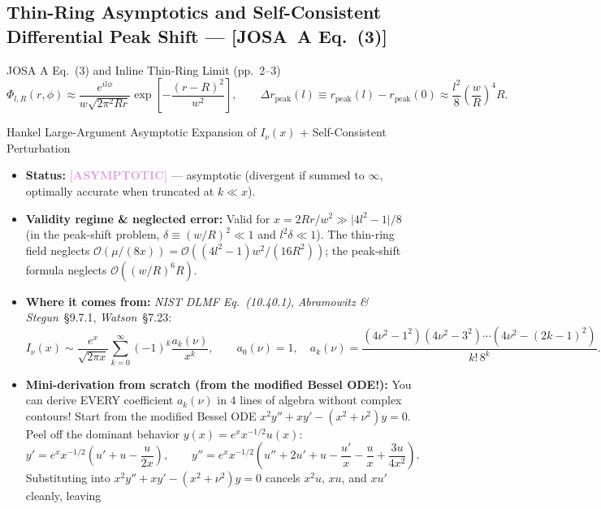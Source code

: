 \documentclass[10pt,letterpaper]{article}
\newcommand{\abs}[1]{\lvert #1 \rvert}
\newcommand{\josa}[1]{\textbf{[JOSA~A Eq.~(#1)]}}
\newcommand{\tagasymp}{\textcolor{plum}{\textbf{[ASYMPTOTIC]}}}
\numberwithin{equation}{section}
\begin{document}
\subsection{Thin-Ring Asymptotics and Self-Consistent Differential Peak Shift --- \josa{3}}

\begin{targeteq}{JOSA A Eq.~(3) and Inline Thin-Ring Limit (pp.~2--3)}
\[
  \Phi_{l,R}(r,\phi) \approx \frac{e^{il\phi}}{w\sqrt{2\pi^2 Rr}}\exp\!\left[-\frac{(r-R)^2}{w^2}\right], \qquad
  \Delta r_{\mathrm{peak}}(l) \equiv r_{\mathrm{peak}}(l) - r_{\mathrm{peak}}(0) \approx \frac{l^2}{8}\left(\frac{w}{R}\right)^4 R.
\]
\end{targeteq}

\begin{approxbox}{Hankel Large-Argument Asymptotic Expansion of $I_\nu(x)$ + Self-Consistent Perturbation}
\begin{itemize}[leftmargin=1.4em,itemsep=2pt,topsep=1pt]
  \item \textbf{Status:} \tagasymp{} --- asymptotic (divergent if summed to $\infty$, optimally accurate when truncated at $k \ll x$).
  \item \textbf{Validity regime \& neglected error:} Valid for $x = 2Rr/w^2 \gg \abs{4l^2 - 1}/8$ (in the peak-shift problem, $\delta \equiv (w/R)^2 \ll 1$ and $l^2\delta \ll 1$). The thin-ring field neglects $\mathcal{O}(\mu/(8x)) = \mathcal{O}((4l^2-1)w^2/(16 R^2))$; the peak-shift formula neglects $\mathcal{O}((w/R)^6 R)$.
  \item \textbf{Where it comes from:} \emph{NIST DLMF Eq.~(10.40.1)}, \emph{Abramowitz \& Stegun}~\S9.7.1, \emph{Watson}~\S7.23:
  \begin{equation}
    I_\nu(x) \sim \frac{e^x}{\sqrt{2\pi x}}\sum_{k=0}^\infty (-1)^k \frac{a_k(\nu)}{x^k}, \qquad a_0(\nu) = 1, \quad a_k(\nu) = \frac{(4\nu^2 - 1^2)(4\nu^2 - 3^2)\cdots(4\nu^2 - (2k-1)^2)}{k!\,8^k}.
    \label{eq:v2_hankel}
  \end{equation}
  \item \textbf{Mini-derivation from scratch (from the modified Bessel ODE!):} You can derive EVERY coefficient $a_k(\nu)$ in 4 lines of algebra without complex contours! Start from the modified Bessel ODE $x^2 y'' + x y' - (x^2 + \nu^2)y = 0$. Peel off the dominant behavior $y(x) = e^x x^{-1/2} u(x)$:
  \[
    y' = e^x x^{-1/2}\!\left(u' + u - \frac{u}{2x}\right), \qquad
    y'' = e^x x^{-1/2}\!\left(u'' + 2u' + u - \frac{u'}{x} - \frac{u}{x} + \frac{3u}{4x^2}\right).
  \]
  Substituting into $x^2 y'' + x y' - (x^2+\nu^2)y = 0$ cancels $x^2 u$, $xu$, and $x u'$ cleanly, leaving

\end{itemize}
\end{approxbox}
\end{document}

